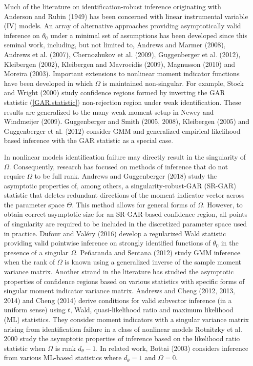 \documentclass[hidelinks, 11 pt, a4paper, pdflatex]{article}
\begin{document}
{  Much of the literature on identification-robust inference originating with Anderson and Rubin (1949) has been concerned with linear instrumental variable (IV) models. An array of alternative approaches providing asymptotically valid inference on $\theta_0$ under a minimal set of assumptions has been developed since this seminal work, including, but not limited to, Andrews and Marmer (2008), Andrews et al. (2007), Chernozhukov et al. (2009), Guggenberger et al. (2012), Kleibergen (2002), Kleibergen and Mavroeidis (2009), Magnusson (2010) and Moreira (2003). Important extensions to nonlinear moment indicator functions have been developed in which $\Omega$ is maintained non-singular. For example, Stock and Wright (2000) study confidence regions formed by inverting the GAR statistic (\ref{GAR.statistic}) non-rejection region under weak identification. These results are generalized to the many weak moment setup in Newey and Windmeijer (2009). Guggenberger and Smith (2005, 2008), Kleibergen (2005) and Guggenberger et al. (2012) consider GMM and generalized empirical likelihood based inference with the GAR statistic as a special case.

  In nonlinear models identification failure may directly result in the singularity of $\Omega$. Consequently, research has focused on methods of inference that do not require $\Omega$ to be full rank. Andrews and Guggenberger (2018) study the asymptotic properties of, among others, a singularity-robust-GAR (SR-GAR) statistic that deletes redundant directions of the moment indicator vector across the parameter space $\Theta$. This method allows for general forms of $\Omega$. However, to obtain correct asymptotic size for an SR-GAR-based confidence region, all points of singularity are required to be included in the discretized parameter space used in practice. Dufour and Val\'{e}ry (2016) develop a regularized Wald statistic providing valid pointwise inference on strongly identified functions of $\theta_0$ in the presence of a singular $\Omega$. Pe\~{n}aranda and Sentana (2012) study GMM inference when the rank of $\Omega$ is known using a generalized inverse of the sample moment variance matrix. Another strand in the literature has studied the asymptotic properties of confidence regions based on various statistics with specific forms of singular moment indicator variance matrix. Andrews and Cheng (2012, 2013, 2014) and Cheng (2014) derive conditions for valid subvector inference (in a uniform sense) using $t$, Wald, quasi-likelihood ratio and maximum likelihood (ML) statistics. They consider moment indicators with a singular variance matrix arising from identification failure in a class of nonlinear models Rotnitzky et al. 2000 study the asymptotic properties of inference based on the likelihood ratio statistic when $\Omega$ is rank $d_{\theta} - 1$. In related work, Bottai (2003) considers inference from various ML-based statistics where $d_{\theta} = 1$ and $\Omega = 0$.

}
\end{document}
